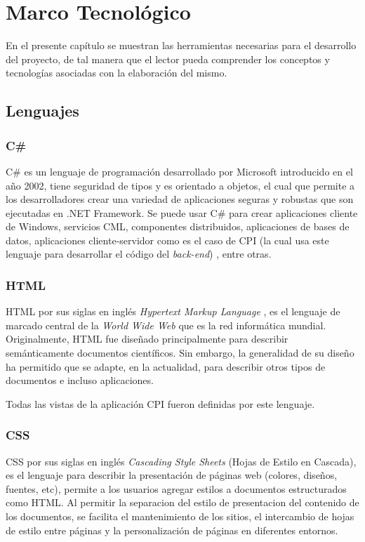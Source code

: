\chapter{Marco Tecnológico}
En el presente capítulo se muestran las herramientas necesarias para el desarrollo del proyecto, de tal manera que el lector pueda comprender los conceptos y tecnologías asociadas con la elaboración del mismo. 

\section{Lenguajes}
\subsection{C\#}
C\# es un lenguaje de programación desarrollado por Microsoft introducido en el año 2002, tiene seguridad de tipos y es orientado a objetos, el cual que permite a los desarrolladores crear una variedad de aplicaciones seguras y robustas que son ejecutadas en .NET Framework. Se puede usar C\# para crear aplicaciones cliente de Windows, servicios CML, componentes distribuidos, aplicaciones de bases de datos, aplicaciones cliente-servidor como es el caso de CPI (la cual usa este lenguaje para desarrollar el código del \textit{back-end}) , entre otras. \cite{cSharpMicrosoft}

\subsection{HTML}
HTML por sus siglas en inglés \textit{Hypertext Markup Language} , es el lenguaje de marcado central de la \textit{World Wide Web} que es la red informática mundial. Originalmente, HTML fue diseñado principalmente para describir semánticamente documentos científicos. Sin embargo, la generalidad de su diseño ha permitido que se adapte, en la actualidad, para describir otros tipos de documentos e incluso aplicaciones. \cite{htmlW3C}

Todas las vistas de la aplicación CPI fueron definidas por este lenguaje.


\subsection{CSS}
CSS por sus siglas en inglés \textit{Cascading Style Sheets} (Hojas de Estilo en Cascada), es el lenguaje para describir la presentación de páginas web (colores, diseños, fuentes, etc), permite a los usuarios agregar estilos a documentos estructurados como HTML. Al permitir la separacion del estilo de presentacion del contenido de los documentos, se facilita el mantenimiento de los sitios, el intercambio de hojas de estilo entre páginas y la personalización  de páginas en diferentes entornos.\cite{cssW3C}

